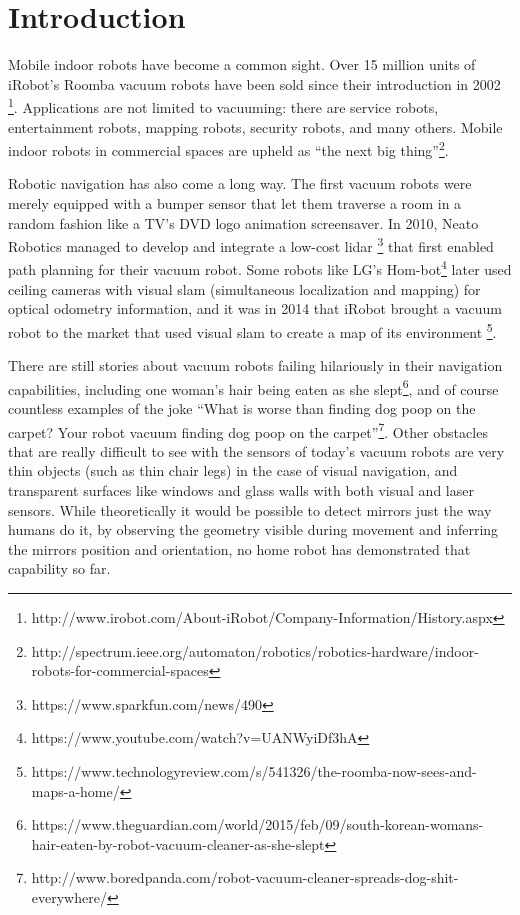 \chapter{Introduction}\label{introduction}

Mobile indoor robots have become a common sight. Over 15 million units
of iRobot's Roomba vacuum robots have been sold since their introduction
in 2002 \footnote{http://www.irobot.com/About-iRobot/Company-Information/History.aspx}.
Applications are not limited to vacuuming: there are service robots,
entertainment robots, mapping robots, security robots, and many others.
Mobile indoor robots in commercial spaces are upheld as ``the next big
thing''\footnote{http://spectrum.ieee.org/automaton/robotics/robotics-hardware/indoor-robots-for-commercial-spaces}.

Robotic navigation has also come a long way. The first vacuum robots
were merely equipped with a bumper sensor that let them traverse a
room in a random fashion like a TV's DVD logo animation screensaver. In 2010, Neato Robotics
managed to develop and integrate a low-cost lidar
\footnote{https://www.sparkfun.com/news/490} that first enabled path
planning for their vacuum robot. Some robots like LG's
Hom-bot\footnote{https://www.youtube.com/watch?v=UANWyiDf3hA} later used
ceiling cameras with visual slam (simultaneous localization and mapping)
for optical odometry information, and it was in 2014 that iRobot
brought a vacuum robot to the market that used visual slam to create a
map of its environment \footnote{https://www.technologyreview.com/s/541326/the-roomba-now-sees-and-maps-a-home/}.

There are still stories about vacuum robots failing hilariously in their
navigation capabilities, including one woman's hair being eaten as she
slept\footnote{https://www.theguardian.com/world/2015/feb/09/south-korean-womans-hair-eaten-by-robot-vacuum-cleaner-as-she-slept},
and of course countless examples of the joke ``What is worse than
finding dog poop on the carpet? Your robot vacuum finding dog poop on
the carpet''\footnote{http://www.boredpanda.com/robot-vacuum-cleaner-spreads-dog-shit-everywhere/}.
Other obstacles that are really difficult to see with the sensors of
today's vacuum robots are very thin objects (such as thin chair legs) in
the case of visual navigation, and transparent surfaces like windows and
glass walls with both visual and laser sensors. While theoretically it
would be possible to detect mirrors just the way humans do it, by
observing the geometry visible during movement and inferring the mirrors
position and orientation, no home robot has demonstrated that capability
so far.

